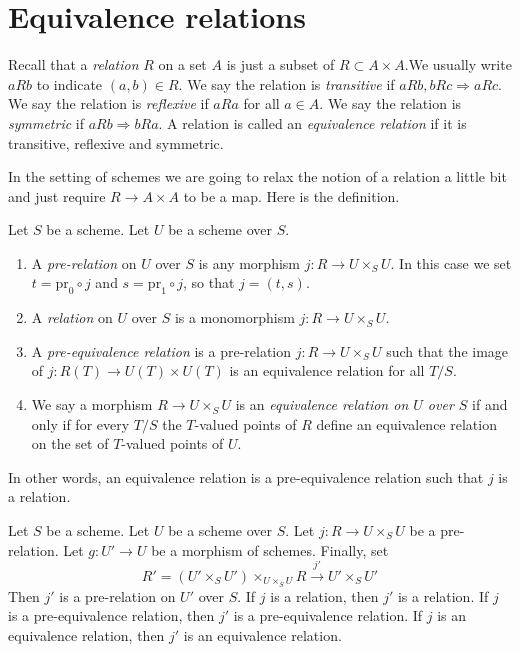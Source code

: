\section{Equivalence relations}
\label{section-equivalence-relations}

\noindent
Recall that a {\it relation} $R$ on a set $A$ is just a subset
of $R \subset A \times A$.We usually write $a R b$ to indicate
$(a, b) \in R$. We say the relation is {\it transitive} if
$a R b, b R c \Rightarrow a R c$. We say the relation is
{\it reflexive} if $a R a$ for all $a \in A$. We say the relation is
{\it symmetric} if $a R b \Rightarrow b R a$.
A relation is called an {\it equivalence relation} if
it is transitive, reflexive and symmetric.

\medskip\noindent
In the setting of schemes we are going to relax the notion of a
relation a little bit and just require $R \to A \times A$ to
be a map. Here is the definition.

\begin{definition}
\label{definition-equivalence-relation}
Let $S$ be a scheme. Let $U$ be a scheme over $S$.
\begin{enumerate}
\item A {\it pre-relation} on $U$ over $S$ is any morphism
$j : R \to U \times_S U$. In this case we set
$t = \text{pr}_0 \circ j$ and $s = \text{pr}_1 \circ j$, so
that $j = (t, s)$.
\item A {\it relation} on $U$ over $S$ is a monomorphism
$j : R \to U \times_S U$.
\item A {\it pre-equivalence relation} is a pre-relation
$j : R \to U \times_S U$ such that the image of
$j : R(T) \to U(T) \times U(T)$ is an equivalence relation for
all $T/S$.
\item We say a morphism $R \to U \times_S U$ is
an {\it equivalence relation on $U$ over $S$}
if and only if for every $T/S$ the $T$-valued
points of $R$ define an equivalence relation
on the set of $T$-valued points of $U$.
\end{enumerate}
\end{definition}

\noindent
In other words, an equivalence relation is a pre-equivalence relation
such that $j$ is a relation.

\begin{lemma}
\label{lemma-restrict-relation}
Let $S$ be a scheme.
Let $U$ be a scheme over $S$.
Let $j : R \to U \times_S U$ be a pre-relation.
Let $g : U' \to U$ be a morphism of schemes.
Finally, set
$$
R' = (U' \times_S U')\times_{U \times_S U} R
\xrightarrow{j'}
U' \times_S U'
$$
Then $j'$ is a pre-relation on $U'$ over $S$.
If $j$ is a relation, then $j'$ is a relation.
If $j$ is a pre-equivalence relation, then $j'$ is a pre-equivalence relation.
If $j$ is an equivalence relation, then $j'$ is an equivalence relation.
\end{lemma}

